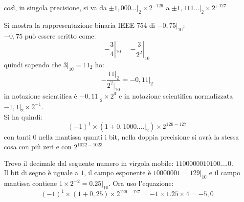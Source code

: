 \documentclass[a4paper,12pt, oneside]{book}
\begin{document}
\begin{enumerate}
  così, in singola precisione, si va da $\pm 1,000...|_2\times 2^{-126}$ a $\pm 1,111...|_2\times 2^{+127}$
  \begin{esempio}
    Si mostra la rappresentazione binaria IEEE 754 di $-0,75|_{10}$:\\
    $-0,75$ può essere scritto come:
    $$-\frac{3}{4}|_{10}=-\frac{3}{2^2}|_{10}$$
    quindi sapendo che $3|_{10}=11_{2}$ ho:
    $$-\frac{11|_2}{2^2|_{10}}=-0,11|_2$$
    in notazione scientifica è $-0,11|_2\times 2^0$ e in notazione scientifica normalizzata $-1,1|_{2}\times 2^{-1}$.\\ Si ha quindi:
    $$(-1)^1\times (1+0,1000....|_2)\times 2^{126-127}$$
    con tanti 0 nella mantissa quanti i bit, nella doppia precisione si avrà la stessa cosa con più zeri e con $2^{1022-1023}$
  \end{esempio}
  \begin{esempio}
    Trovo il decimale dal seguente numero in virgola mobile: $1100000010100....0$.\\ Il bit di segno è uguale a $1$, il campo esponente è $10000001=129|_{10}$ e il campo mantissa contiene $1\times 2^{-2}=0.25|_{10}$. Ora uso l'equazione:
    $$(-1)^1\times (1+0,25)\times 2^{129-127}= -1\times 1.25\times 4=-5,0$$
  \end{esempio}
\end{enumerate}
\end{document}
